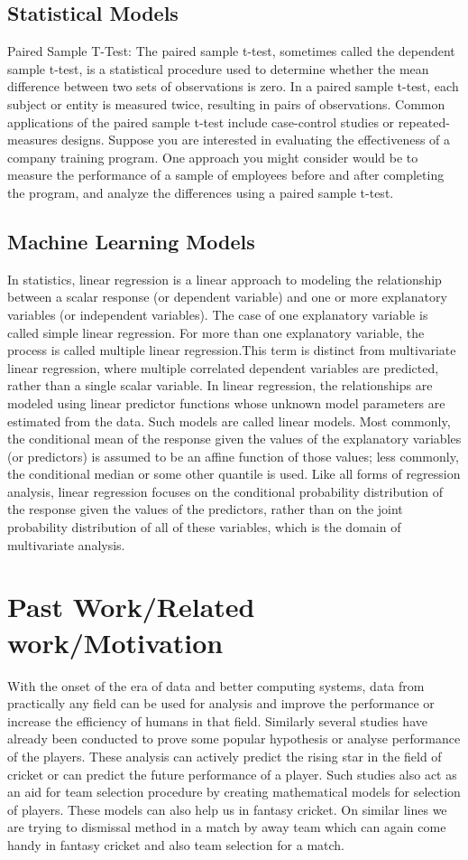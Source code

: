 \documentclass[fleqn,10pt]{wlscirep}
\begin{document}
\subsection{Statistical Models}
Paired Sample T-Test: 
The paired sample t-test, sometimes called the dependent sample t-test, is a statistical procedure used to 
determine whether the mean difference between two sets of observations is zero. In a paired sample t-test, 
each subject or entity is measured twice, resulting in pairs of observations. Common applications of the 
paired sample t-test include case-control studies or repeated-measures designs. Suppose you are interested in 
evaluating the effectiveness of a company training program. One approach you might consider would be to measure 
the performance of a sample of employees before and after completing the program, and analyze the differences 
using a paired sample t-test.

\subsection{Machine Learning Models}
In statistics, linear regression is a linear approach to modeling the relationship between a scalar response (or dependent variable) and one or more explanatory variables (or independent variables). 
The case of one explanatory variable is called simple linear regression. For more than one explanatory variable, the process is called multiple linear regression.This term is distinct from multivariate linear regression, where multiple correlated dependent variables are predicted, rather than a single scalar variable.
In linear regression, the relationships are modeled using linear predictor functions whose unknown model parameters are estimated from the data. Such models are called linear models. Most commonly, the conditional mean of the response given 
the values of the explanatory variables (or predictors) is assumed to be an affine function of those values; less commonly, the conditional median or some other quantile is used. Like all forms of regression analysis, linear regression focuses 
on the conditional probability distribution of the response given the values of the predictors, rather than on the joint probability distribution of all of these variables, which is the domain of multivariate analysis.
\section{Past Work/Related work/Motivation}
With the onset of the era of data and better computing systems, data from practically any field can be used for analysis and 
improve the performance or increase the efficiency of humans in that field. Similarly several studies have already been conducted to prove some popular 
hypothesis or analyse performance of the players. These analysis can actively predict the rising star in the field of cricket or can predict the 
future performance of a player. Such studies also act as an aid for team selection procedure by creating mathematical models for selection of players.
These models can also help us in fantasy cricket.
On similar lines we are trying to dismissal method in a match by away team which can again come handy in fantasy cricket and also team selection for a match.
\end{document}

